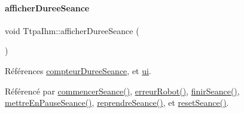 \paragraph{\texorpdfstring{afficher\+Duree\+Seance}{afficherDureeSeance}}
{\footnotesize\ttfamily void Ttpa\+Ihm\+::afficher\+Duree\+Seance (\begin{DoxyParamCaption}{ }\end{DoxyParamCaption})\hspace{0.3cm}{\ttfamily [slot]}}



Références \hyperlink{class_ttpa_ihm_abb5ab7cc023685e40cb278f0210f276f}{compteur\+Duree\+Seance}, et \hyperlink{class_ttpa_ihm_ad5fae1222a667da158c26f3d0f0dce23}{ui}.



Référencé par \hyperlink{class_ttpa_ihm_a9bf7a4cddbdbf786d781e4d084409068}{commencer\+Seance()}, \hyperlink{class_ttpa_ihm_a3a2380e2259f7b5bb1fd4d2ae470e06d}{erreur\+Robot()}, \hyperlink{class_ttpa_ihm_aec3a96864aaa87f245bdafbf7a076a94}{finir\+Seance()}, \hyperlink{class_ttpa_ihm_a4888ff555295f4e90e0d42bd87ad2d92}{mettre\+En\+Pause\+Seance()}, \hyperlink{class_ttpa_ihm_acf4cf42c5d1481ccda7ae12bace0a6d5}{reprendre\+Seance()}, et \hyperlink{class_ttpa_ihm_a521fea1cb4384157e5422a033e9a4d4f}{reset\+Seance()}.



